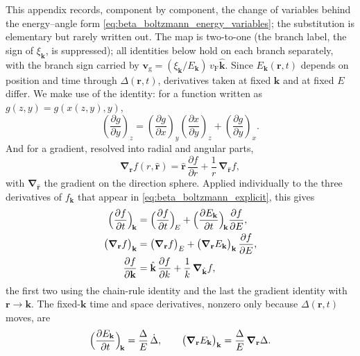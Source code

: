 \documentclass[
  aps,
  prb,
  preprint,
  superscriptaddress,
  longbibliography,
  nofootinbib
]{revtex4-2}
\newcommand{\br}{\mathbf{r}}
\newcommand{\bk}{\mathbf{k}}
\newcommand{\bv}{\mathbf{v}}
\newcommand{\bnabla}{\boldsymbol{\nabla}}
\newcommand{\vF}{v_{\mathrm{F}}}
\begin{document}
This appendix records, component by component, the change of variables
behind the energy--angle form \cref{eq:beta_boltzmann_energy_variables}; the
substitution is elementary but rarely written out.
The map is two-to-one (the branch label, the sign of \(\xi_{\bk}\), is
suppressed); all identities below hold on each branch separately, with
the branch sign carried by
\(\bv_{\mathrm g}=(\xi_{\bk}/E_{\bk})\,\vF\hat{\bk}\).
Since \(E_{\bk}(\br,t)\) depends on position and time through
\(\Delta(\br,t)\), derivatives taken at fixed \(\bk\) and at fixed
\(E\) differ. We make use of the identity: for a function written as
\(g(z,y)=g(x(z,y),y)\),
\begin{equation}
\left(\frac{\partial g}{\partial y}\right)_z
=
\left(\frac{\partial g}{\partial x}\right)_y
\left(\frac{\partial x}{\partial y}\right)_z
+
\left(\frac{\partial g}{\partial y}\right)_x .
\end{equation}
And for a gradient, resolved into radial and angular parts,
\begin{equation}
\bnabla_{\br} f(r,\hat{\br})
=
\hat{\br}\,\frac{\partial f}{\partial r}
+
\frac{1}{r}\,\bnabla_{\hat{\br}} f ,
\end{equation}
with \(\bnabla_{\hat{\br}}\) the gradient on the direction sphere.
Applied individually to the three derivatives of \(f_{\bk}\) that
appear in \cref{eq:beta_boltzmann_explicit}, this gives
\begin{align}
  \Bigl(\frac{\partial f}{\partial t}\Bigr)_{\!\bk}
  &=
  \Bigl(\frac{\partial f}{\partial t}\Bigr)_{\!E}
  +
  \Bigl(\frac{\partial E_{\bk}}{\partial t}\Bigr)_{\!\bk}
  \frac{\partial f}{\partial E},
  \label{eq:intro_chain_t}
  \\
  \bigl(\bnabla_{\br}f\bigr)_{\bk}
  &=
  \bigl(\bnabla_{\br}f\bigr)_{E}
  +
  \bigl(\bnabla_{\br}E_{\bk}\bigr)_{\bk}\,
  \frac{\partial f}{\partial E},
  \label{eq:intro_chain_r}
  \\
  \frac{\partial f}{\partial\bk}
  &=
  \hat{\bk}\,\frac{\partial f}{\partial k}
  +
  \frac{1}{k}\,\bnabla_{\hat{\bk}} f ,
  \label{eq:intro_p_basic}
\end{align}
the first two using the chain-rule identity and the last the gradient
identity with \(\br\to\bk\). The fixed-\(\bk\) time and space
derivatives, nonzero only because \(\Delta(\br,t)\) moves, are
\begin{equation}
  \Bigl(\frac{\partial E_{\bk}}{\partial t}\Bigr)_{\!\bk}
  =
  \frac{\Delta}{E}\,\dot{\Delta},
  \qquad
  \bigl(\bnabla_{\br}E_{\bk}\bigr)_{\bk}
  =
  \frac{\Delta}{E}\,\bnabla_{\br}\Delta .
  \label{eq:intro_E_derivatives}
\end{equation}
\end{document}
